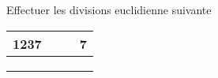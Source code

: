 Effectuer les divisions euclidienne suivante


\begin{tabular}{lc|cr}
1237 &  &  & 7 \\ \hline
&&& \\
&&& \\
&&& \\
\end{tabular}
